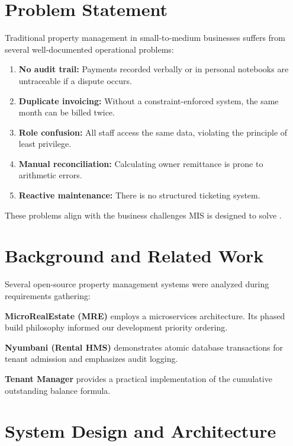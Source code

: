 \documentclass[conference]{IEEEtran}
\begin{document}
\section{Problem Statement}

Traditional property management in small-to-medium businesses suffers from several well-documented operational problems:

\begin{enumerate}
    \item \textbf{No audit trail:} Payments recorded verbally or in personal notebooks are untraceable if a dispute occurs.
    \item \textbf{Duplicate invoicing:} Without a constraint-enforced system, the same month can be billed twice.
    \item \textbf{Role confusion:} All staff access the same data, violating the principle of least privilege.
    \item \textbf{Manual reconciliation:} Calculating owner remittance is prone to arithmetic errors.
    \item \textbf{Reactive maintenance:} There is no structured ticketing system.
\end{enumerate}

These problems align with the business challenges MIS is designed to solve \cite{laudon2013}.

\section{Background and Related Work}

Several open-source property management systems were analyzed during requirements gathering:

\textbf{MicroRealEstate (MRE)} \cite{mre2023} employs a microservices architecture. Its phased build philosophy informed our development priority ordering.

\textbf{Nyumbani (Rental HMS)} \cite{nyumbani2022} demonstrates atomic database transactions for tenant admission and emphasizes audit logging.

\textbf{Tenant Manager} \cite{tenantmgr2021} provides a practical implementation of the cumulative outstanding balance formula.

\section{System Design and Architecture}
\end{document}
